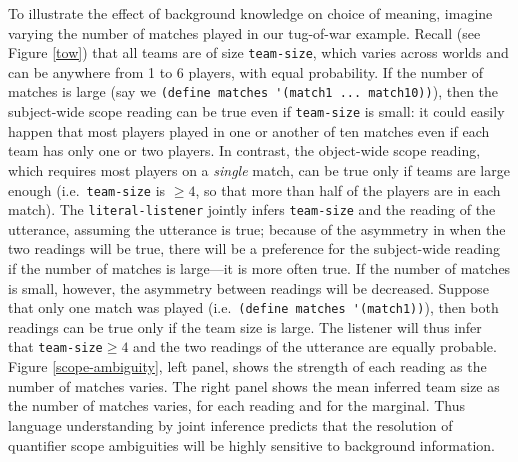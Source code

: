 \documentclass[pdfextras]{handbook}
\begin{document}
To illustrate the effect of background knowledge on choice of meaning, imagine varying the number of matches played in our tug-of-war example. 
Recall (see Figure \ref{tow}) that all teams are of size \lstinline{team-size}, which varies across worlds and can be anywhere from 1 to 6 players, with equal probability. 
If the number of matches is large (say we \lstinline{(define matches '(match1 ... match10))}), then the subject-wide scope reading can be true even if \lstinline{team-size} is small: it could easily happen that most players played in one or another of ten matches even if each team has only one or two players. 
%
In contrast, the object-wide scope reading, which requires most players on a \emph{single} match, can be true only if teams are large enough (i.e.~\lstinline{team-size} is $\geq 4$, so that more than half of the players are in each match). 
The \lstinline{literal-listener} jointly infers \lstinline{team-size} and the reading of the utterance, assuming the utterance is true; because of the asymmetry in when the two readings will be true, there will be a preference for the subject-wide reading if the number of matches is large---it is more often true.
If the number of matches is small, however, the asymmetry between readings will be decreased. 
Suppose that only one match was played (i.e.~\lstinline{(define matches '(match1))}), then both readings can be true only if the team size is large.
The listener will thus infer that \lstinline{team-size}$\geq 4$ and the two readings of the utterance are equally probable.
Figure \ref{scope-ambiguity}, left panel, shows the strength of each reading as the number of matches varies. 
The right panel shows the mean inferred team size as the number of matches varies, for each reading and for the marginal. 
Thus language understanding by joint inference predicts that the resolution of quantifier scope ambiguities will be highly sensitive to background information. 
\end{document}
